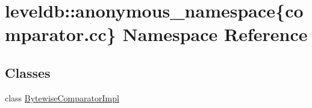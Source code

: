 \hypertarget{namespaceleveldb_1_1anonymous__namespace_02comparator_8cc_03}{}\section{leveldb\+:\+:anonymous\+\_\+namespace\{comparator.\+cc\} Namespace Reference}
\label{namespaceleveldb_1_1anonymous__namespace_02comparator_8cc_03}
\subsection*{Classes}
\begin{DoxyCompactItemize}
\item 
class \hyperlink{classleveldb_1_1anonymous__namespace_02comparator_8cc_03_1_1_bytewise_comparator_impl}{Bytewise\+Comparator\+Impl}
\end{DoxyCompactItemize}
